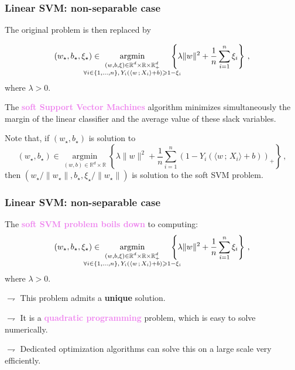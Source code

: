 \documentclass[9pt]{beamer}
\DeclareMathOperator*{\argmin}{argmin}%
\newcommand{\eqsp}{\,}
\begin{document}
\begin{frame}
\frametitle{Linear SVM: non-separable case}

The original problem is then replaced by

\begin{equation*}
(w_\star,b_\star,\xi_\star)\in  \hspace{-.8cm}  \underset{\substack{(w,b,\xi)\in\mathbb{R}^d\times \mathbb{R}\times\mathbb{R}_+^d\\ \forall i\in\{1,\ldots,n\},\eqsp Y_i\left(\langle w\eqsp;\eqsp X_i\rangle + b\right)\geqslant 1-\xi_i}}{\argmin} \hspace{-.5cm} \left\{\lambda\|w\|^2 + \frac{1}{n}\sum_{i=1}^n\xi_i\right\}\eqsp,
\end{equation*}
where $\lambda >0$.

\vspace{.3cm}

The \textcolor{violet}{{\bf soft Support Vector Machines}} algorithm minimizes \alert{simultaneously the margin of the linear classifier and the average value of these slack variables}.

\vspace{.3cm}

Note that, if $(w_\star,b_\star)$ is solution to
\begin{equation*}
(w_\star,b_\star)\in  \underset{(w,b)\in\mathbb{R}^d\times \mathbb{R}}{\argmin}  \left\{\lambda\|w\|^2 + \frac{1}{n}\sum_{i=1}^n(1-Y_i\left(\langle w\eqsp;\eqsp X_i\rangle + b\right))_+\right\}\eqsp,
\end{equation*}
then $(w_\star/\|w_\star\|,b_\star,\xi_\star/\|w_\star\|)$ is solution to \alert{the soft SVM problem}.
\end{frame}



\begin{frame}
\frametitle{Linear SVM: non-separable case}

The \textcolor{violet}{{\bf soft SVM problem boils down}} to computing:
\begin{equation*}
(w_\star,b_\star,\xi_\star)\in  \hspace{-.8cm}  \underset{\substack{(w,b,\xi)\in\mathbb{R}^d\times \mathbb{R}\times\mathbb{R}_+^d\\ \forall i\in\{1,\ldots,n\},\eqsp Y_i\left(\langle w\eqsp;\eqsp X_i\rangle + b\right)\geqslant 1-\xi_i}}{\argmin} \hspace{-.5cm} \left\{\lambda\|w\|^2 + \frac{1}{n}\sum_{i=1}^n\xi_i\right\}\eqsp,
\end{equation*}
where $\lambda >0$.

\vspace{.3cm}

$\rightharpoondown$ This problem \alert{admits a \textbf{unique} solution}.
 
$\rightharpoondown$ It is a \textcolor{violet}{{\bf quadratic programming}} problem, which is easy to solve numerically.

$\rightharpoondown$ Dedicated optimization algorithms can \alert{solve this on a large scale very efficiently}.



\end{frame}
\end{document}
